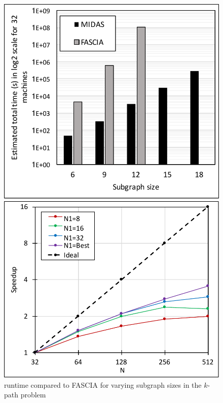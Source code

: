 \begin{figure}[!htb]
    \centering
    \begin{minipage}{0.29\textwidth}
        \centering        
        \includegraphics[width=1\columnwidth]{img/fig-perf-vsfascia.pdf}
        \caption{\ouralgo{} runtime compared to FASCIA for varying subgraph sizes in the $k$-path problem}
        \label{fig:fig-perf-vsfascia.pdf}
    \end{minipage}
    \hspace{0mm}
    \begin{minipage}{0.32\textwidth}
        \centering        
        \includegraphics[width=1\columnwidth]{img/kpath-N1N/fig-perf-kpath-1mil-speedup-N1fixed.pdf}

\end{minipage}
\end{figure}
